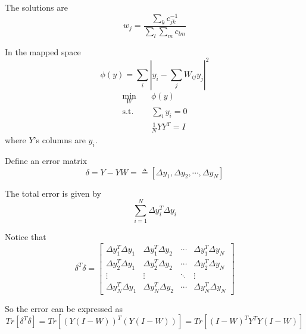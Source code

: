         The solutions are
        \[ w_j = \frac{\sum_k c^{-1}_{jk}}{\sum_l\sum_m c_{lm}} \]

        In the mapped space
        \[ \phi(y) = \sum_i\left| y_i - \sum_j W_{ij}y_j \right|^2 \]
        \begin{align*}
            \min_W &\quad \phi(y)\\
            \text{s.t.} &\quad \sum_i y_i = 0\\
            &\quad \frac{1}{N} YY^T = I
        \end{align*}
        where $Y$'s columns are $y_i$.

        Define an error matrix
        \[ \delta = Y-YW = \triangleq [\Delta y_1,\Delta y_2,\cdots,\Delta y_N]\]

        The total error is given by
        \[ \sum_{i=1}^N \Delta y_i^T \Delta y_i \]

        Notice that
        \[ \delta^T\delta = \begin{bmatrix}
            \Delta y_1^T \Delta y_1 & \Delta y_1^T \Delta y_2 & \cdots & \Delta y_1^T \Delta y_N\\
            \Delta y_2^T \Delta y_1 & \Delta y_2^T \Delta y_2 & \cdots & \Delta y_2^T \Delta y_N\\
            \vdots & \vdots & \ddots & \vdots\\
            \Delta y_N^T \Delta y_1 & \Delta y_N^T \Delta y_2 & \cdots & \Delta y_N^T \Delta y_N
        \end{bmatrix} \]

        So the error can be expressed as
        \[ Tr[\delta^T\delta] = Tr[(Y(I-W))^T(Y(I-W))] = Tr[(I-W)^TY^TY(I-W)] \]
